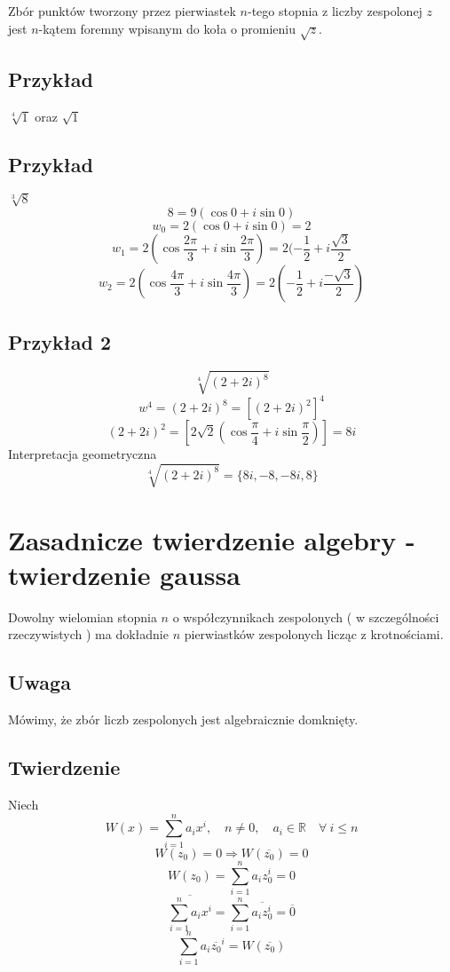 \documentclass[11pt]{article}
\begin{document}
Zbór punktów tworzony przez pierwiastek $n$-tego stopnia  z liczby zespolonej $z$ jest $n$-kątem foremny wpisanym do koła o promieniu $\sqrt{z}$.
\newpage
\subsection{Przykład}
$ \sqrt[4]{1} $
oraz
$ \sqrt{1} $

\subsection{Przykład}
$ \sqrt[3]{8} $
$$ 8 = 9 ( \cos{0} + i\sin{0} )$$
$$ w_0 = 2 (\cos{0} + i\sin{0} ) = 2$$
$$ w_1 = 2 (\cos{\frac{2\pi}{3}} + i\sin{\frac{2\pi}{3}}) = 2(-\frac{1}{2} + i\frac{\sqrt{3}}{2}$$
$$ w_2 = 2 (\cos{\frac{4\pi}{3}} + i\sin{\frac{4\pi}{3}}) = 2(-\frac{1}{2} + i\frac{-\sqrt{3}}{2})$$
\subsection{Przykład 2}
$$\sqrt[4]{(2+2i)^8}$$
$$ w^4 = (2+2i)^8 = \left[(2+2i)^2\right]^4 $$
$$(2+2i)^2 = \left[2\sqrt{2}\left(\cos{\frac{\pi}{4}} + i \sin{\frac{\pi}{2}}\right)\right] =  8i $$
Interpretacja geometryczna
$$ \sqrt[4]{(2+2i)^8} = \{ 8i , -8, -8i , 8 \} $$

\section{Zasadnicze twierdzenie algebry - twierdzenie gaussa}
Dowolny wielomian stopnia $n$ o współczynnikach zespolonych ( w szczególności rzeczywistych ) ma dokładnie $n$ pierwiastków zespolonych licząc z krotnościami.

\subsection{Uwaga}
Mówimy, że zbór liczb zespolonych jest algebraicznie domknięty. 

\newpage
\subsection{Twierdzenie}
Niech
$$ W(x) = \sum_{i=1}^{n} a_ix^i , \quad n \not = 0 , \quad a_i \in \mathbb{R} \quad  \forall\ i \leq n $$
$$ W(z_0) = 0 \Longrightarrow W(\overline{z_0}) = 0$$
$$ W(z_0) = \sum_{i=1}^{n} a_iz_0^i = 0$$
$$\overline{\sum_{i=1}^{n} a_ix^i} = \sum_{i=1}^{n} \overline{a_i z_0^i} = \overline{0}$$
$$ \sum_{i=1}^{n} a_i\overline{z_0}^i = W(\overline{z_0}) $$
\end{document}
